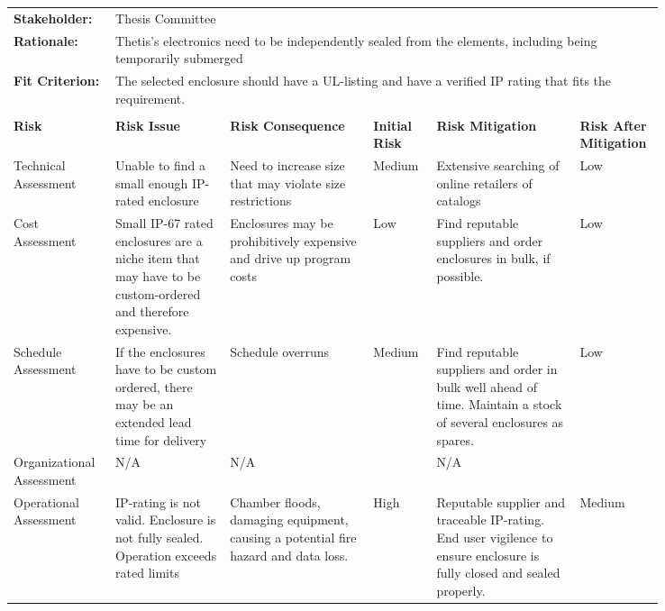 \begin{landscape}
{\begin{longtable}{| p{0.12\linewidth} | p{0.16\linewidth} |  p{0.20\linewidth} | p{0.08\linewidth} | p{0.20\linewidth} | p{0.08\linewidth} |}
	\hline
	\rowcolor[gray]{0.8}
	\multicolumn{6}{|c|}{ } \\
	\hline
	\textbf{Stakeholder:} & \multicolumn{5}{|l|}{Thesis Committee} \\
	\hline
	\textbf{Rationale:} & \multicolumn{5}{|p{0.8\linewidth}|}{Thetis's electronics need to be independently sealed from the elements, including being temporarily submerged } \\
	\hline
	\textbf{Fit Criterion:} & \multicolumn{5}{|p{0.8\linewidth}|}{The selected enclosure should have a UL-listing and have a verified IP rating that fits the requirement.} \\
	\hline
	\rowcolor[gray]{0.8}
	\multicolumn{6}{|c|}{ } \\
	\hline
	\textbf{Risk} & \textbf{Risk Issue} & \textbf{Risk Consequence} & \textbf{Initial Risk} & \textbf{Risk Mitigation} & \textbf{Risk \newline After \newline Mitigation} \\
	\hline
	Technical \newline Assessment & Unable to find a small enough IP-rated enclosure & Need to increase size that may violate size restrictions & \cellcolor{yellow} Medium & Extensive searching of online retailers of catalogs & \cellcolor{green} Low \\
	\hline
	Cost \newline Assessment & Small IP-67 rated enclosures are a niche item that may have to be custom-ordered and therefore expensive. & Enclosures may be prohibitively expensive and drive up program costs & \cellcolor{green} Low & Find reputable suppliers and order enclosures in bulk, if possible. & \cellcolor{green} Low \\
	\hline
	Schedule \newline Assessment & If the enclosures have to be custom ordered, there may be an extended lead time for delivery & Schedule overruns & \cellcolor{yellow} Medium & Find reputable suppliers and order in bulk well ahead of time. \newline Maintain a stock of several enclosures as spares. & \cellcolor{green} Low \\
	\hline
	Organizational \newline Assessment & N/A & N/A & \cellcolor[gray]{0.8} & N/A & \cellcolor[gray]{0.8} \\
	\hline
	Operational \newline Assessment & IP-rating is not valid. \newline Enclosure is not fully sealed. \newline Operation exceeds rated limits & Chamber floods, damaging equipment, causing a potential fire hazard and data loss. & \cellcolor{red} High & Reputable supplier and traceable IP-rating. \newline End user vigilence to ensure enclosure is fully closed and sealed properly. & \cellcolor{yellow} Medium
	\label{tab:sr02_feasibility}
\end{longtable}
}
\newpage


\end{landscape}
